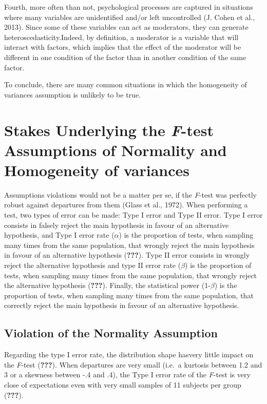 \documentclass[man,floatsintext]{apa6}
\begin{document}
Fourth, more often than not, psychological processes are captured in
situations where many variables are unidentified and/or left
uncontrolled (J. Cohen et al., 2013). Since some of these variables can
act as moderators, they can generate heteroscedasticity.Indeed, by
definition, a moderator is a variable that will interact with factors,
which implies that the effect of the moderator will be different in one
condition of the factor than in another condition of the same factor.

To conclude, there are many common situations in which the homogeneity
of variances assumption is unlikely to be true.

\section{\texorpdfstring{Stakes Underlying the \emph{F}-test Assumptions
of Normality and Homogeneity of
variances}{Stakes Underlying the F-test Assumptions of Normality and Homogeneity of variances}}\label{stakes-underlying-the-f-test-assumptions-of-normality-and-homogeneity-of-variances}

Assumptions violations would not be a matter per se, if the
\emph{F}-test was perfectly robust against departures from them (Glass
et al., 1972). When performing a test, two types of error can be made:
Type I error and Type II error. Type I error consists in falsely reject
the main hypothesis in favour of an alternative hypothesis, and Type I
error rate (\(\alpha\)) is the proportion of tests, when sampling many
times from the same population, that wrongly reject the main hypothesis
in favour of an alternative hypothesis ({\textbf{???}}). Type II error
consists in wrongly reject the alternative hypothesis and type II error
rate (\(\beta\)) is the proportion of tests, when sampling many times
from the same population, that wrongly reject the alternative hypothesis
({\textbf{???}}). Finally, the statistical power (1-\(\beta\)) is the
proportion of tests, when sampling many times from the same population,
that correctly reject the main hypothesis in favour of an alternative
hypothesis.

\subsection{Violation of the Normality
Assumption}\label{violation-of-the-normality-assumption}

Regarding the type I error rate, the distribution shape hasvery little
impact on the \emph{F}-test ({\textbf{???}}). When departures are very
small (i.e.~a kurtosis between 1.2 and 3 or a skewness between -.4 and
.4), the Type I error rate of the \emph{F}-test is very close of
expectations even with very small samples of 11 subjects per group
({\textbf{???}}).
\end{document}
